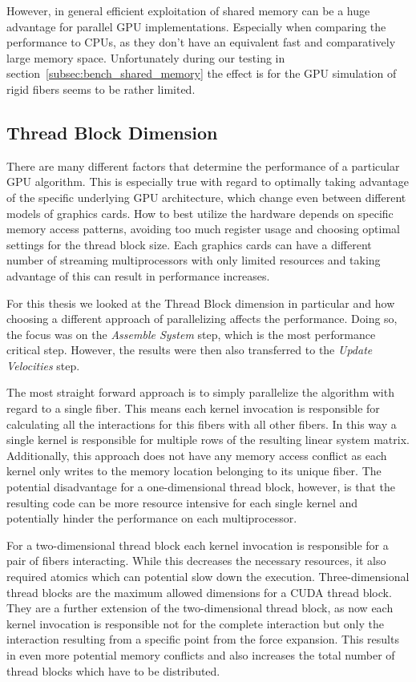 \documentclass[a4paper,11pt]{kth-mag}
\begin{document}
However, in general efficient exploitation of shared memory can be a huge advantage for parallel GPU implementations. Especially when comparing the performance to CPUs, as they don't have an equivalent fast and comparatively large memory space. Unfortunately during our testing in section~\ref{subsec:bench_shared_memory} the effect is for the GPU simulation of rigid fibers seems to be rather limited.

\subsection{Thread Block Dimension}
\label{subsec:bench_thread_block}

There are many different factors that determine the performance of a particular GPU algorithm. This is especially true with regard to optimally taking advantage of the specific underlying GPU architecture, which change even between different models of graphics cards. How to best utilize the hardware depends on specific memory access patterns, avoiding too much register usage and choosing optimal settings for the thread block size. Each graphics cards can have a different number of streaming multiprocessors with only limited resources and taking advantage of this can result in performance increases.

For this thesis we looked at the Thread Block dimension in particular and how choosing a different approach of parallelizing affects the performance. Doing so, the focus was on the \emph{Assemble System} step, which is the most performance critical step. However, the results were then also transferred to the \emph{Update Velocities} step.

The most straight forward approach is to simply parallelize the algorithm with regard to a single fiber. This means each kernel invocation is responsible for calculating all the interactions for this fibers with all other fibers. In this way a single kernel is responsible for multiple rows of the resulting linear system matrix. Additionally, this approach does not have any memory access conflict as each kernel only writes to the memory location belonging to its unique fiber. The potential disadvantage for a one-dimensional thread block, however, is that the resulting code can be more resource intensive for each single kernel and potentially hinder the performance on each multiprocessor.

For a two-dimensional thread block each kernel invocation is responsible for a pair of fibers interacting. While this decreases the necessary resources, it also required atomics which can potential slow down the execution. Three-dimensional thread blocks are the maximum allowed dimensions for a CUDA thread block. They are a further extension of the two-dimensional thread block, as now each kernel invocation is responsible not for the complete interaction but only the interaction resulting from a specific point from the force expansion. This results in even more potential memory conflicts and also increases the total number of thread blocks which have to be distributed.
\end{document}
